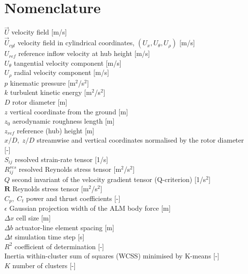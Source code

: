 \section*{Nomenclature}
$\vec{U}$             velocity field [m/s] \\
$\vec{U}_{cyl}$       velocity field in cylindrical coordinates, $(U_x, U_\theta, U_\rho)$ [m/s] \\
$U_{ref}$            reference inflow velocity at hub height [m/s] \\
$U_\theta$           tangential velocity component [m/s] \\
$U_\rho$             radial velocity component [m/s] \\
$p$                  kinematic pressure [m$^2$/s$^2$] \\
$k$                  turbulent kinetic energy [m$^2$/s$^2$] \\
$D$                  rotor diameter [m] \\
$z$                  vertical coordinate from the ground [m] \\
$z_0$                aerodynamic roughness length [m] \\
$z_{ref}$            reference (hub) height [m] \\
$x/D,\; z/D$         streamwise and vertical coordinates normalised by the rotor diameter [-] \\
$S_{ij}$             resolved strain-rate tensor [1/s] \\
$R_{ij}^{res}$       resolved Reynolds stress tensor [m$^2$/s$^2$] \\
$Q$                  second invariant of the velocity gradient tensor (Q-criterion) [1/s$^2$] \\
$\mathbf{R}$         Reynolds stress tensor [m$^2$/s$^2$] \\
$C_p,\; C_t$         power and thrust coefficients [-] \\
$\epsilon$           Gaussian projection width of the ALM body force [m] \\
$\Delta x$           cell size [m] \\
$\Delta b$           actuator-line element spacing [m] \\
$\Delta t$           simulation time step [s] \\
$R^2$                coefficient of determination [-] \\
$\mathrm{Inertia}$   within-cluster sum of squares (WCSS) minimised by K-means [-] \\
$K$                  number of clusters [-] \\

